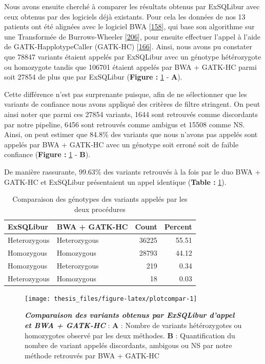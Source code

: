 \documentclass[12pt,a4paper,twoside]{ugathesis}
\theoremstyle{definition}
\theoremstyle{definition}
\theoremstyle{definition}
\theoremstyle{remark}
\begin{document}
\newpage

Nous avons ensuite cherché à comparer les résultats obtenus par
ExSQLibur avec ceux obtenus par des logiciels déjà existants. Pour cela
les données de nos 13 patients ont été alignées avec le logiciel BWA
{[}\protect\hyperlink{ref-Li2009b}{158}{]}, qui base son algorithme sur
une Transformée de Burrows-Wheeler
{[}\protect\hyperlink{ref-Burrows1994}{206}{]}, pour ensuite effectuer
l'appel à l'aide de GATK-HapplotypeCaller (GATK-HC)
{[}\protect\hyperlink{ref-McKenna2010}{166}{]}. Ainsi, nous avons pu
constater que 78847 variants étaient appelés par ExSQLibur avec un
génotype hétérozygote ou homozygote tandis que 106701 étaient appelés
par BWA + GATK-HC parmi soit 27854 de plus que par ExSQLibur
(\textbf{Figure : }\ref{fig:plotcompar} - \textbf{A}).

Cette différence n'est pas surprenante puisque, afin de ne sélectionner
que les variants de confiance nous avons appliqué des critères de filtre
stringent. On peut ainsi noter que parmi ces 27854 variants, 1644 sont
retrouvés comme discordants par notre pipeline, 6456 sont retrouvés
comme ambigus et 15508 comme NS. Ainsi, on peut estimer que 84.8\% des
variants que nous n'avons pas appelés sont appelés par BWA + GATK-HC
avec un génotype soit erroné soit de faible confiance (\textbf{Figure :
}\ref{fig:plotcompar} - \textbf{B}).

De manière rassurante, 99.63\% des variants retrouvés à la fois par le
duo BWA + GATK-HC et ExSQLibur présentaient un appel identique
(\textbf{Table : }\ref{tab:tabcallcomp}).

\begin{longtable}[t]{llrr}
\caption{\label{tab:tabcallcomp}Comparaison des génotypes des variants appelés par les deux procédures}\\
\toprule
ExSQLibur & BWA + GATK-HC & Count & Percent\\
\midrule
Heterozygous & Heterozygous & 36225 & 55.51\\
Homozygous & Homozygous & 28793 & 44.12\\
Homozygous & Heterozygous & 219 & 0.34\\
Heterozygous & Homozygous & 18 & 0.03\\
\bottomrule
\end{longtable}

\newpage

\begin{figure}

{\centering \texttt{[image: thesis\_files/figure-latex/plotcompar-1]} 

}

\caption[Comparaison des variants obtenus par ExSQLibur d'appel et BWA + GATK-HC]{\textbf{\emph{Comparaison des variants obtenus par
ExSQLibur d'appel et BWA + GATK-HC}} : \textbf{A} : Nombre de variants
hétérozygotes ou homozygotes observé par les deux méthodes. \textbf{B} :
Quantification du nombre de variant appelés discordants, ambigous ou NS
par notre méthode retrouvés par BWA + GATK-HC}\label{fig:plotcompar}
\end{figure}
\end{document}
